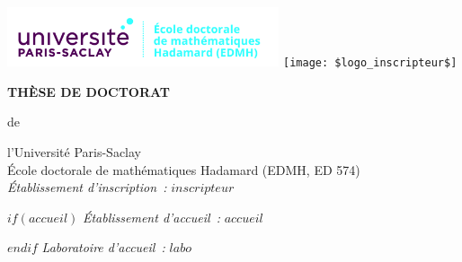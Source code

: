 \documentclass[a4paper,12pt]{reedthesis}
\begin{document}
\thispagestyle{empty}
\vspace{-2cm}

\voffset-10pt


\noindent
\hspace*{-1cm}\hbox{\includegraphics[width=8cm]{logos/edmh.jpg}}
\hfill
{}
\hfill
\hbox{\texttt{[image: \$logo\_inscripteur\$]}}
\vspace{7mm}

\begin{center}
{\Large\bf THÈSE DE DOCTORAT}
\end{center}
\begin{center}
{de }
\end{center}
\begin{center}
 {\Large\sc l'Université Paris-Saclay}\\
  \vspace*{0.4cm}
École doctorale de mathématiques Hadamard (EDMH, ED 574)\\
 \vspace*{0.4cm}
{\small \it Établissement d'inscription~:} $inscripteur$

 \vspace*{0.2cm}
$if(accueil)$
{\small \it Établissement d'accueil~:} $accueil$

\vspace*{0.2cm}
$endif$
{\small \it Laboratoire d'accueil~:} $labo$

\vspace*{0.2cm}
\end{center}
\end{document}
